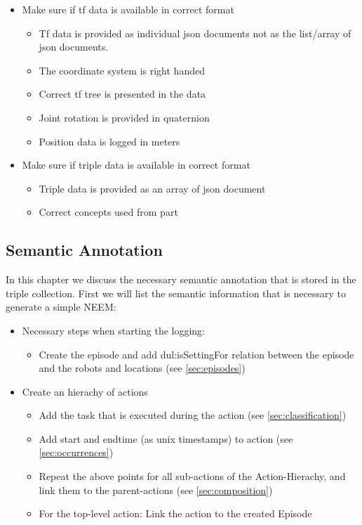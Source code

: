 \begin{itemize}
	\item Make sure if tf data is available in correct format
	\begin{itemize}
		\item Tf data is provided as individual json documents not as the list/array of json documents.
		\item The coordinate system is right handed
		\item Correct tf tree is presented in the data
		\item Joint rotation is provided in quaternion
		\item Position data is logged in meters
	\end{itemize}
	\item Make sure if triple data is available in correct format
	\begin{itemize}
		\item Triple data is provided as an array of json document
		\item Correct \soma concepts used from \neemnar part
	\end{itemize}
\end{itemize}

\subsection{Semantic Annotation}
\label{sec:semantic_annotation}

In this chapter we discuss the necessary semantic annotation that is stored in the triple collection. First we will list the semantic information that is necessary to generate a simple NEEM:

\begin{itemize}
	\item Necessary steps when starting the logging:
	\begin{itemize}
		\item Create the episode and add dul:isSettingFor relation between the episode and the robots and locations (see \ref{sec:episodes})
	\end{itemize}
	\item Create an hierachy of actions
	\begin{itemize}
		\item Add the task that is executed during the action (see \ref{sec:classification})
		\item Add start and endtime (as unix timestamps) to action (see \ref{sec:occurrences})
		\item Repeat the above points for all sub-actions of the Action-Hierachy, and link them to the parent-actions (see \ref{sec:composition})
		\item For the top-level action: Link the action to the created Episode
	\end{itemize}
\end{itemize}

